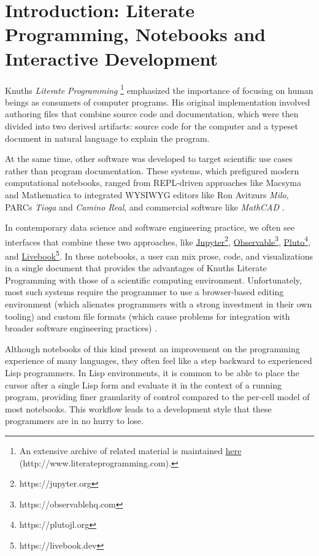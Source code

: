 \documentclass[sigconf,screen]{acmart}
\begin{document}
\hypertarget{introduction:-literate-programmingux2c-notebooks-and-interactive-development}{%
\section{Introduction: Literate Programming, Notebooks and Interactive Development}\label{introduction:-literate-programmingux2c-notebooks-and-interactive-development}}

Knuth\textquotesingle s \emph{Literate Programming} \footnote{An extensive archive of related material is maintained {\href{http://www.literateprogramming.com}{here} (http://www.literateprogramming.com)}.} emphasized the importance of focusing on human beings as consumers of computer programs. His original implementation involved authoring files that combine source code and documentation, which were then divided into two derived artifacts: source code for the computer and a typeset document in natural language to explain the program.

At the same time, other software was developed to target scientific use cases rather than program documentation. These systems, which prefigured modern computational notebooks, ranged from REPL-driven approaches like Macsyma and Mathematica to integrated WYSIWYG editors like Ron Avitzur\textquotesingle s \emph{Milo}, PARC\textquotesingle s \emph{Tioga} and \emph{Camino Real}, and commercial software like \emph{MathCAD} \cite{Kajler_1998}.

In contemporary data science and software engineering practice, we often see interfaces that combine these two approaches, like {\href{https://jupyter.org}{Jupyter}\footnote{https://jupyter.org}}, {\href{https://observablehq.com}{Observable}\footnote{https://observablehq.com}}, {\href{https://plutojl.org}{Pluto}\footnote{https://plutojl.org}}, and {\href{https://livebook.dev}{Livebook}\footnote{https://livebook.dev}}. In these notebooks, a user can mix prose, code, and visualizations in a single document that provides the advantages of Knuth\textquotesingle s Literate Programming with those of a scientific computing environment. Unfortunately, most such systems require the programmer to use a browser-based editing environment (which alienates programmers with a strong investment in their own tooling) and custom file formats (which cause problems for integration with broader software engineering practices) \cite{Chattopadhyay_2020}.

Although notebooks of this kind present an improvement on the programming experience of many languages, they often feel like a step backward to experienced Lisp programmers. In Lisp environments, it is common to be able to place the cursor after a single Lisp form and evaluate it in the context of a running program, providing finer granularity of control compared to the per-cell model of most notebooks. This workflow leads to a development style that these programmers are in no hurry to lose.
\end{document}
